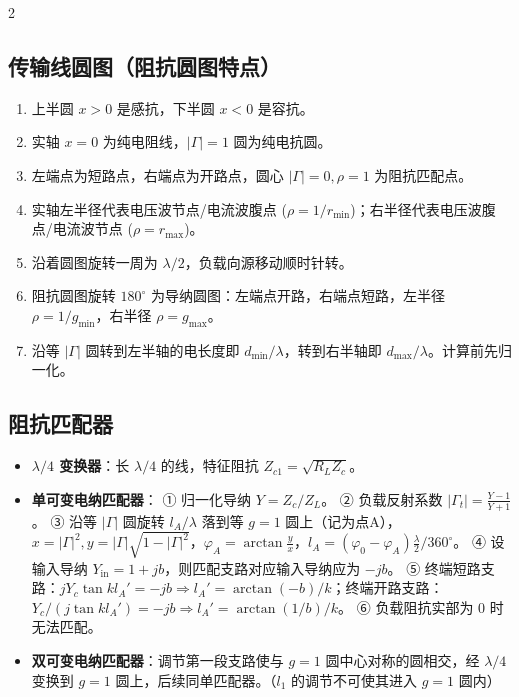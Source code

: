 \documentclass[10pt,a4paper,landscape]{article}
\begin{document}
\begin{multicols}{2}
\subsection{传输线圆图（阻抗圆图特点）}
\begin{enumerate}
    \item 上半圆 $x>0$ 是感抗，下半圆 $x<0$ 是容抗。
    \item 实轴 $x=0$ 为纯电阻线，$|\Gamma|=1$ 圆为纯电抗圆。
    \item 左端点为短路点，右端点为开路点，圆心 $|\Gamma|=0, \rho=1$ 为阻抗匹配点。
    \item 实轴左半径代表电压波节点/电流波腹点 ($\rho = 1/r_{\min}$)；右半径代表电压波腹点/电流波节点 ($\rho = r_{\max}$)。
    \item 沿着圆图旋转一周为 $\lambda/2$，负载向源移动顺时针转。
    \item 阻抗圆图旋转 $180^\circ$ 为导纳圆图：左端点开路，右端点短路，左半径 $\rho = 1/g_{\min}$，右半径 $\rho = g_{\max}$。
    \item 沿等 $|\Gamma|$ 圆转到左半轴的电长度即 $d_{\min}/\lambda$，转到右半轴即 $d_{\max}/\lambda$。计算前先归一化。
\end{enumerate}

\subsection{阻抗匹配器}
\begin{itemize}
    \item \textbf{$\lambda/4$ 变换器}：长 $\lambda/4$ 的线，特征阻抗 $Z_{c1} = \sqrt{R_L Z_c}$。
    \item \textbf{单可变电纳匹配器}：
    ① 归一化导纳 $Y = Z_c / Z_L$。
    ② 负载反射系数 $|\Gamma_t| = \frac{Y-1}{Y+1}$。
    ③ 沿等 $|\Gamma|$ 圆旋转 $l_A/\lambda$ 落到等 $g=1$ 圆上（记为点A），$x=|\Gamma|^2, y=|\Gamma|\sqrt{1-|\Gamma|^2}$，$\varphi_A = \arctan\frac{y}{x}$，$l_A = (\varphi_0 - \varphi_A)\frac{\lambda}{2}/360^\circ$。
    ④ 设输入导纳 $Y_{\text{in}} = 1+jb$，则匹配支路对应输入导纳应为 $-jb$。
    ⑤ 终端短路支路：$jY_c\tan kl_A' = -jb \Rightarrow l_A' = \arctan(-b)/k$；终端开路支路：$Y_c / (j\tan kl_A') = -jb \Rightarrow l_A' = \arctan(1/b)/k$。
    ⑥ 负载阻抗实部为 0 时无法匹配。
    \item \textbf{双可变电纳匹配器}：调节第一段支路使与 $g=1$ 圆中心对称的圆相交，经 $\lambda/4$ 变换到 $g=1$ 圆上，后续同单匹配器。（$l_1$ 的调节不可使其进入 $g=1$ 圆内）
\end{itemize}


\end{multicols}
\end{document}
